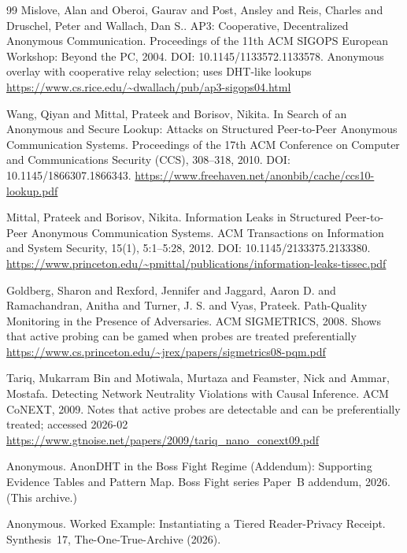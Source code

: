 \documentclass[11pt]{article}
\begin{document}
\begin{thebibliography}{99}
Mislove, Alan and Oberoi, Gaurav and Post, Ansley and Reis, Charles and Druschel, Peter and Wallach, Dan S..
\newblock AP3: Cooperative, Decentralized Anonymous Communication.
\newblock Proceedings of the 11th ACM SIGOPS European Workshop: Beyond the PC, 2004.
\newblock DOI: 10.1145/1133572.1133578.
\newblock Anonymous overlay with cooperative relay selection; uses DHT-like lookups
\newblock \url{https://www.cs.rice.edu/~dwallach/pub/ap3-sigops04.html}

Wang, Qiyan and Mittal, Prateek and Borisov, Nikita.
\newblock In Search of an Anonymous and Secure Lookup: Attacks on Structured Peer-to-Peer Anonymous Communication Systems.
\newblock Proceedings of the 17th ACM Conference on Computer and Communications Security (CCS), 308--318, 2010.
\newblock DOI: 10.1145/1866307.1866343.
\newblock \url{https://www.freehaven.net/anonbib/cache/ccs10-lookup.pdf}

Mittal, Prateek and Borisov, Nikita.
\newblock Information Leaks in Structured Peer-to-Peer Anonymous Communication Systems.
\newblock ACM Transactions on Information and System Security, 15(1), 5:1--5:28, 2012.
\newblock DOI: 10.1145/2133375.2133380.
\newblock \url{https://www.princeton.edu/~pmittal/publications/information-leaks-tissec.pdf}

Goldberg, Sharon and Rexford, Jennifer and Jaggard, Aaron D. and Ramachandran, Anitha and Turner, J. S. and Vyas, Prateek.
\newblock Path-Quality Monitoring in the Presence of Adversaries.
\newblock ACM SIGMETRICS, 2008.
\newblock Shows that active probing can be gamed when probes are treated preferentially
\newblock \url{https://www.cs.princeton.edu/~jrex/papers/sigmetrics08-pqm.pdf}

Tariq, Mukarram Bin and Motiwala, Murtaza and Feamster, Nick and Ammar, Mostafa.
\newblock Detecting Network Neutrality Violations with Causal Inference.
\newblock ACM CoNEXT, 2009.
\newblock Notes that active probes are detectable and can be preferentially treated; accessed 2026-02
\newblock \url{https://www.gtnoise.net/papers/2009/tariq_nano_conext09.pdf}

Anonymous.
\newblock AnonDHT in the Boss Fight Regime (Addendum): Supporting Evidence Tables and Pattern Map.
\newblock Boss Fight series Paper~B addendum, 2026. (This archive.)

Anonymous.
\newblock Worked Example: Instantiating a Tiered Reader-Privacy Receipt.
\newblock Synthesis~17, The-One-True-Archive (2026).


\end{thebibliography}
\end{document}
